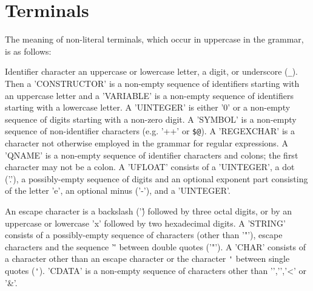 \documentclass[11pt,a4paper]{article}
\begin{document}
\section{Terminals} 
 
\MakeShortVerb{\'} 
 
The meaning of non-literal terminals, which occur in uppercase in the 
grammar, is as follows: 
 
Identifier character an uppercase or lowercase letter, a digit, or 
underscore (\texttt{\_}).  Then a 'CONSTRUCTOR' is a non-empty sequence of 
identifiers starting with an uppercase letter and a 'VARIABLE' is a 
non-empty sequence of identifiers starting with a lowercase letter.  A 
'UINTEGER' is either '0' or a non-empty sequence of digits starting with 
a non-zero digit.  A 'SYMBOL' is a non-empty sequence of non-identifier 
characters (e.g. '++' or \texttt{\$@}).  A 'REGEXCHAR' is a character not otherwise 
employed in the grammar for regular expressions.  A 'QNAME' is a 
non-empty sequence of identifier characters and colons; the first 
character may not be a colon.  A 'UFLOAT' consists of a 'UINTEGER', a dot 
('.'), a possibly-empty sequence of digits and an optional exponent part 
consisting of the letter 'e', an optional minus ('-'), and a 'UINTEGER'. 
 
An escape character is a backslash ('\') followed by three octal 
digits, or by an uppercase or lowercase 'x' followed by two 
hexadecimal digits.  A 'STRING' consists of a possibly-empty sequence of 
characters (other than '"'), escape characters and the sequence '\"' 
between double quotes ('"').  A 'CHAR' consists of a character other than 
an escape character or the character \verb$'$ between single quotes (\verb$'$). 
'CDATA' is a non-empty sequence of characters other than '{','}','<' or '&'. 
 
\DeleteShortVerb{\'} 
 
 
\end{document}
